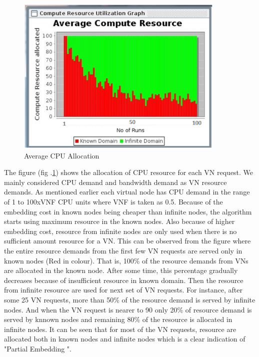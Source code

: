 \documentclass[article,dr=phil,type=msc ,colorback,accentcolor=tud4b]{tudthesis}
\begin{document}
\begin{figure}[h]
	\centering
	\includegraphics[width=10cm]{CPU_PE.png}
	\caption{Average CPU Allocation}
	\label{cpu_alloc}
\end{figure}

The figure (fig .\ref{cpu_alloc}) shows the allocation of CPU resource for each VN request. We mainly considered CPU demand and bandwidth demand as VN resource demands. As mentioned earlier each virtual node has CPU demand in the range of 1 to 100xVNF CPU units where VNF is taken as 0.5. Because of the embedding cost in known nodes being cheaper than infinite nodes, the algorithm starts using maximum resource in the known nodes. Also because of higher embedding cost, resource from infinite nodes are only used when there is no sufficient amount resource for a VN. This can be observed from the figure where the entire resource demands from the first few VN requests are served only in known nodes (Red in colour). That is, 100\% of the resource demands from VNs are allocated in the known node. After some time, this percentage gradually decreases because of insufficient resource in known domain. Then the resource from infinite resource are used for next set of VN requests. For instance, after some 25 VN requests, more than 50\% of the resource demand is served by infinite nodes. And when the VN request is nearer to 90 only 20\% of resource demand is served by knnown nodes and remaining 80\% of the resource is allocated in infinite nodes. It can be seen that for most of the VN requests, resource are allocated both in known nodes and infinite nodes which is a clear indication of "Partial Embedding ". \newline
\end{document}
